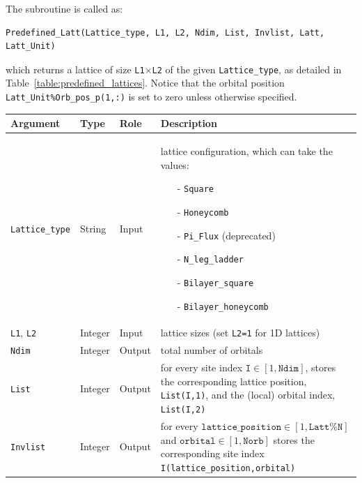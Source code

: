 The subroutine is called as:
\begin{lstlisting}[style=fortran]
Predefined_Latt(Lattice_type, L1, L2, Ndim, List, Invlist, Latt, Latt_Unit)
\end{lstlisting}
which returns a lattice of size \texttt{L1$\times$L2} of the given \texttt{Lattice\_type}, as detailed in Table~\ref{table:predefined_lattices}. Notice that the orbital position \texttt{Latt\_Unit\%Orb\_pos\_p(1,:)} is set to zero unless otherwise specified.
%
\begin{table}[h]
	\begin{center}
	\begin{tabular}{@{} p{}  p{} p{} p{}  @{}}
		\toprule
		Argument                 & Type       & Role   & Description \\
		\midrule
		\texttt{Lattice\_type}   & String     & Input  & lattice configuration, which can take the values:
		\vspace{-\topsep} %
		\begin{itemize}
			\setlength{\itemsep}{0pt} \setlength{\parskip}{0pt} \setlength{\parsep}{0pt}
			\item[-] \texttt{Square}
			\item[-] \texttt{Honeycomb}
			\item[-] \texttt{Pi\_Flux}  (deprecated)
			\item[-] \texttt{N\_leg\_ladder}
			\item[-] \texttt{Bilayer\_square}
			\item[-] \texttt{Bilayer\_honeycomb}
			\vspace{-1.4\topsep} 
		\end{itemize} \\
		\texttt{L1}, \texttt{L2} & Integer    & Input  & lattice sizes (set \texttt{L2=1} for 1D lattices)\\
		\texttt{Ndim}            & Integer    & Output & total number of orbitals\\
		\texttt{List}            & Integer    & Output & for every site index $\texttt{I} \in [1,\texttt{Ndim}]$, stores the corresponding lattice position, \texttt{List(I,1)}, and the (local) orbital index, \texttt{List(I,2)}\\
		\texttt{Invlist}         & Integer    & Output &  for every $\texttt{lattice\_position} \in [1,\texttt{Latt\%N}]$ and $\texttt{orbital} \in [1,\texttt{Norb}]$ stores the corresponding site index \texttt{I(lattice\_position,orbital)}\\

\end{tabular}
\end{center}
\end{table}
